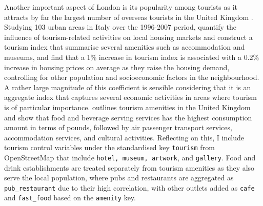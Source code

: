 \documentclass{article}
\begin{document}
Another important aspect of London is its popularity among tourists as it attracts by far the largest number of overseas tourists in the United Kingdom \citep{OfficeforNationalStatistics2019OverseasSeries}. Studying 103 urban areas in Italy over the 1996-2007 period, \citet{Biagi2015DoesItaly} quantify the influence of tourism-related activities on local housing markets and construct a tourism index that summarise several amenities such as accommodation and museums, and find that a 1\% increase in tourism index is associated with a 0.2\% increase in housing prices on average as they raise the housing demand, controlling for other population and socioeconomic factors in the neighbourhood. A rather large magnitude of this coefficient is sensible considering that it is an aggregate index that captures several economic activities in areas where tourism is of particular importance. \citet{OfficeforNationalStatistics2013The2009} outlines tourism amenities in the United Kingdom and show that food and beverage serving services has the highest consumption amount in terms of pounds, followed by air passenger transport services, accommodation services, and cultural activities. Reflecting on this, I include tourism control variables under the standardised key \texttt{tourism} from OpenStreetMap that include \texttt{hotel, museum, artwork}, and \texttt{gallery}. Food and drink establishments are treated separately from tourism amenities as they also serve the local population, where pubs and restaurants are aggregated as \texttt{pub\_restaurant} due to their high correlation, with other outlets added as \texttt{cafe} and \texttt{fast\_food} based on the \texttt{amenity} key.\\\\
\end{document}
